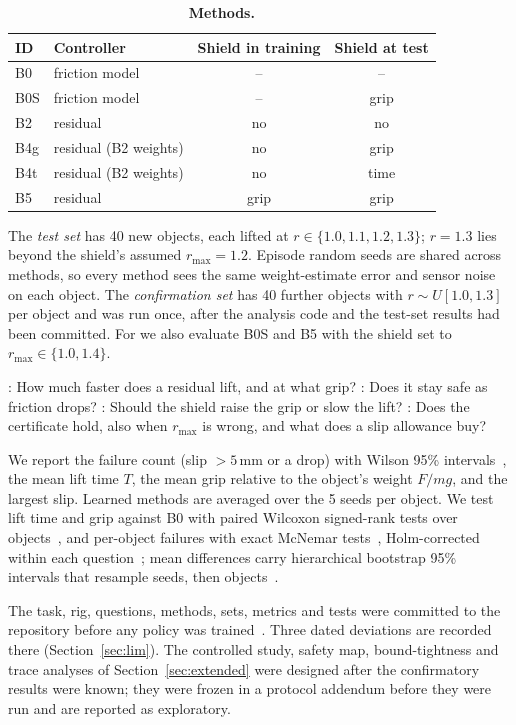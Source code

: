 \begin{table}[t]\centering\footnotesize
\caption{\textbf{Methods.}}\label{tab:methods}
\setlength{\tabcolsep}{3.5pt}
\begin{tabular}{@{}llcc@{}}\toprule
ID & Controller & Shield in training & Shield at test\\\midrule
B0 & friction model & -- & --\\
B0S & friction model & -- & grip\\
B2 & residual & no & no\\
B4g & residual (B2 weights) & no & grip\\
B4t & residual (B2 weights) & no & time\\
B5 & residual & grip & grip\\\bottomrule
\end{tabular}\end{table}

 The \emph{test set} has 40 new objects, each lifted at $r\in\{1.0,1.1,1.2,1.3\}$; $r=1.3$ lies
beyond the shield's assumed $r_{\max}=1.2$. Episode random seeds are shared across methods, so every method sees the same
weight-estimate error and sensor noise on each object. The \emph{confirmation set} has 40 further objects with
$r\sim U[1.0,1.3]$ per object and was run once, after the analysis code and the test-set results had been committed. For
 we also evaluate B0S and B5 with the shield set to $r_{\max}\in\{1.0,1.4\}$.

 : How much faster does a residual lift, and at what grip? : Does it stay safe as friction drops?
: Should the shield raise the grip or slow the lift? : Does the certificate hold, also when $r_{\max}$ is wrong, and
what does a slip allowance buy?

 We report the failure count (slip $>5$\,mm or a drop) with Wilson 95\%
intervals~\cite{wilson1927}, the mean lift time $T$, the mean grip relative to the object's weight $F/mg$, and the largest
slip. Learned methods are averaged over the 5 seeds per object. We test lift time and grip against B0 with paired
Wilcoxon signed-rank tests over objects~\cite{wilcoxon1945}, and per-object failures with exact McNemar
tests~\cite{mcnemar1947}, Holm-corrected within each question~\cite{holm1979}; mean differences carry hierarchical
bootstrap 95\% intervals that resample seeds, then objects~\cite{efron1993}.

 The task, rig, questions, methods, sets, metrics and tests were committed to the repository
before any policy was trained~\cite{nosek2018}. Three dated deviations are recorded there (Section~\ref{sec:lim}). The
controlled study, safety map, bound-tightness and trace analyses of Section~\ref{sec:extended} were designed after the
confirmatory results were known; they were frozen in a protocol addendum before they were run and are reported as
exploratory.
